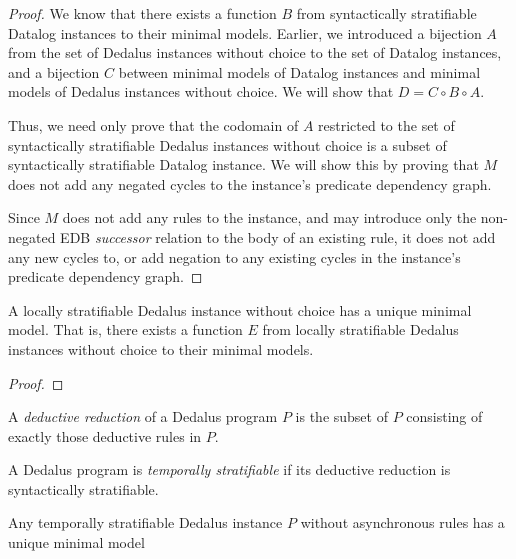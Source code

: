 \documentclass{acm_proc_article-sp-sigmod09}
\newcommand{\wrm}[1]{{\color{BurntOrange}{#1 -- wrm}}}
\begin{document}
\begin{proof}
%
We know that there exists a function $B$ from syntactically stratifiable
Datalog instances to their minimal models.  Earlier, we introduced \wrm{XXX:
where?} a bijection \wrm{XXX: probably not a bijection} $A$ from the set of
Dedalus instances without choice to the set of Datalog instances, and a
bijection $C$ between minimal models of Datalog instances and minimal models of
Dedalus instances without choice.  We will show that $D = C \circ B \circ A$.

Thus, we need only prove that the codomain of $A$ restricted to the set of
syntactically stratifiable Dedalus instances without choice is a subset of
syntactically stratifiable Datalog instance.  We will show this by proving that
$M$ does not add any negated cycles to the instance's predicate dependency
graph.

Since $M$ does not add any rules to the instance, and may introduce only the
non-negated EDB {\em successor} relation to the body of an existing rule, it
does not add any new cycles to, or add negation to any existing cycles in the
instance's predicate dependency graph.
%
\end{proof}

\begin{definition}
%
\wrm{Def of locally stratifiable}
%
\end{definition}

\begin{lemma}
%
A locally stratifiable Dedalus instance without choice has a unique
minimal model.  That is, there exists a function $E$ from locally
stratifiable Dedalus instances without choice to their minimal models.
%
\end{lemma}

\begin{proof}
%
\wrm{TODO}
%
\end{proof}


\begin{definition}
%
A \emph{deductive reduction} of a Dedalus program $P$ is the subset of $P$
consisting of exactly those deductive rules in $P$.
%
\end{definition}

\begin{definition} 
%
A Dedalus program is \emph{temporally stratifiable} if its deductive
reduction is syntactically stratifiable.
%
\end{definition}

\begin{lemma}
%
Any temporally stratifiable Dedalus instance $P$ without asynchronous rules has
a unique minimal model
%
\end{lemma} 
\end{document}
